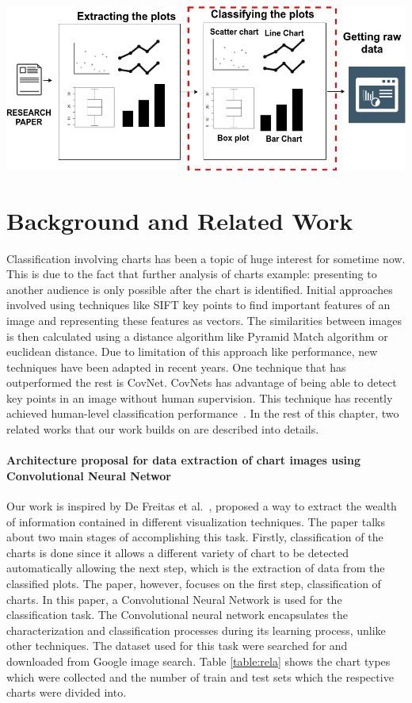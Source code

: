 \documentclass[12pt, a4paper,oneside]{report}
\begin{document}
\includegraphics [scale=0.5] {vision}

\chapter{Background and Related Work}
Classification involving charts has been a topic of huge interest for sometime now. This is due to the fact that further analysis of charts example: presenting to another audience is only possible after the chart is identified. Initial approaches involved using techniques like SIFT key points to find important features of an image \cite{prasad2007classifying} and representing these features as vectors. The similarities between images is then calculated using a distance algorithm like Pyramid Match algorithm or euclidean 
distance. Due to limitation of this approach like performance, new techniques have been adapted in recent years. One technique that has outperformed the rest is CovNet. CovNets has advantage of being able to detect key points in an image without human supervision. This technique has recently achieved human-level classification performance~\cite{geirhos2017comparing}. In the rest of this chapter, two related works that our work builds on are described into details.  

\subsubsection{Architecture proposal for data extraction of chart images using Convolutional Neural Networ}
Our work is inspired by De Freitas et al.~\cite{junior2017archi}, proposed a way to extract the wealth of information contained in different visualization techniques. The paper talks about two main stages of accomplishing this task. Firstly, classification of the charts is done since it allows a different variety of chart to be detected automatically allowing the next step, which is the extraction of data from the classified plots. The paper, however, focuses on the first step, classification of charts. In this paper, a Convolutional Neural Network is used for the classification task. The Convolutional neural network encapsulates the characterization and classification processes during its learning process, unlike other techniques. The dataset used for this task were searched for and downloaded from Google image search. Table \ref{table:rela} shows the chart types which were collected and the number of train and test sets which the respective charts were divided into.
\end{document}
